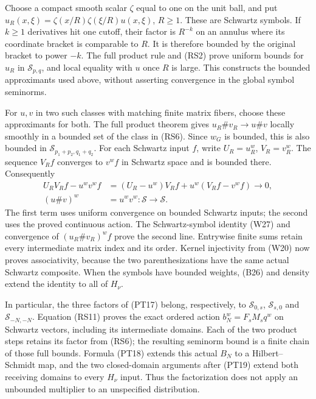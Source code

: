 \documentclass[
  11pt,
]{article}
\begin{document}
Choose a compact smooth scalar \(\zeta\) equal to one on the unit ball,
and put \(u_R(x,\xi)=\zeta(x/R)\zeta(\xi/R)u(x,\xi)\), \(R\geq1\). These
are Schwartz symbols. If \(k\geq1\) derivatives hit one cutoff, their
factor is \(R^{-k}\) on an annulus where its coordinate bracket is
comparable to \(R\). It is therefore bounded by the original bracket to
power \(-k\). The full product rule and (RS2) prove uniform bounds for
\(u_R\) in \(\mathcal S_{p,q}\), and local equality with \(u\) once
\(R\) is large. This constructs the bounded approximants used above,
without asserting convergence in the global symbol seminorms.

For \(u,v\) in two such classes with matching finite matrix fibers,
choose these approximants for both. The full product theorem gives
\(u_R\#v_R\to u\#v\) locally smoothly in a bounded set of the class in
(RS6). Since \(w_G\) is bounded, this is also bounded in
\(\mathcal S_{p_1+p_2,q_1+q_2}\). For each Schwartz input \(f\), write
\(U_R=u_R^w\), \(V_R=v_R^w\). The sequence \(V_Rf\) converges to
\(v^wf\) in Schwartz space and is bounded there. Consequently \[
 \begin{split}
 U_RV_Rf-u^wv^wf
 &=(U_R-u^w)V_Rf+u^w(V_Rf-v^wf)\longrightarrow0,\\
 (u\#v)^w&=u^wv^w:\mathcal S\longrightarrow\mathcal S .
 \end{split}
 \tag{RS11}
\] The first term uses uniform convergence on bounded Schwartz inputs;
the second uses the proved continuous action. The Schwartz-symbol
identity (W27) and convergence of \((u_R\#v_R)^wf\) prove the second
line. Entrywise finite sums retain every intermediate matrix index and
its order. Kernel injectivity from (W20) now proves associativity,
because the two parenthesizations have the same actual Schwartz
composite. When the symbols have bounded weights, (B26) and density
extend the identity to all of \(H_\nu\).

In particular, the three factors of (PT17) belong, respectively, to
\(\mathcal S_{0,s}\), \(\mathcal S_{s,0}\) and \(\mathcal S_{-N,-N}\).
Equation (RS11) proves the exact ordered action \(b_N^w=F_sM_sq^w\) on
Schwartz vectors, including its intermediate domains. Each of the two
product steps retains its factor from (RS6); the resulting seminorm
bound is a finite chain of those full bounds. Formula (PT18) extends
this actual \(B_N\) to a Hilbert--Schmidt map, and the two closed-domain
arguments after (PT19) extend both receiving domains to every \(H_\nu\)
input. Thus the factorization does not apply an unbounded multiplier to
an unspecified distribution.
\end{document}

